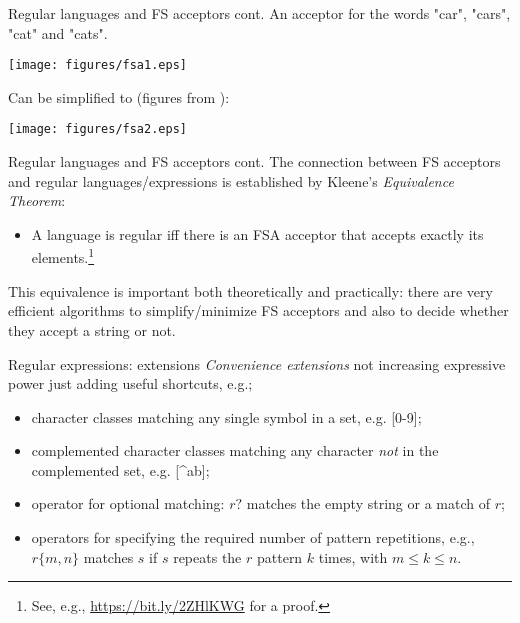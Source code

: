\documentclass[style=upen, size=14pt]{powerdot}
\newcommand{\gold}{\color{arany}}
\theoremstyle{definition}
\begin{document}
\begin{slide}[toc=]{Regular languages and FS acceptors cont.}
  An acceptor for the words "car", "cars", "cat" and "cats".
  \begin{center}
    \texttt{[image: figures/fsa1.eps]}
  \end{center}
  Can be simplified to (figures from \cite{buutbogel2009fsmorph}):
  \begin{center}
    \texttt{[image: figures/fsa2.eps]}
  \end{center}
\end{slide}

\begin{slide}[toc=]{Regular languages and FS acceptors cont.}
  The connection between FS acceptors and regular languages/expressions is
  established by Kleene's \emph{\gold Equivalence Theorem}:
  \begin{itemize}
  \item A language is regular iff there is an FSA acceptor that accepts exactly
    its elements.\footnote{See, e.g.,
      \href{https://bit.ly/2ZHlKWG}{https://bit.ly/2ZHlKWG} for a proof.}
  \end{itemize}
  This equivalence is important both theoretically and practically: there are
  very efficient algorithms to simplify/minimize FS acceptors and also to decide
  whether they accept a string or not.
\end{slide}

\begin{slide}[toc=]{Regular expressions: extensions}
  \emph{\gold Convenience extensions} not increasing expressive power just adding useful
  shortcuts, e.g.;
  \begin{itemize}
  \item character classes matching any single symbol in a set, e.g. [0-9];
  \item complemented character classes matching any character \emph{not} in the
    complemented set, e.g. [\^{}ab];
  \item operator for optional  matching: $r?$ matches the empty string or a match of $r$;
  \item operators for specifying the required number of pattern repetitions,
    e.g., $r\{m,n\}$ matches $s$ if $s$ repeats the $r$ pattern $k$ times, with
    $m\leq k \leq n$.
  \end{itemize}
\end{slide}
\end{document}
